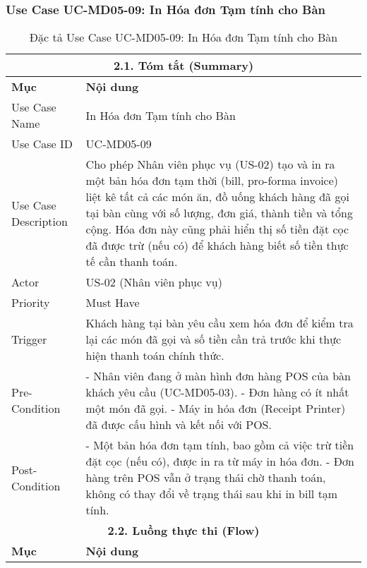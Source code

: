 \subsubsection{Use Case UC-MD05-09: In Hóa đơn Tạm tính cho Bàn}
\begin{longtable}{|m{4cm}|p{11cm}|}
\caption{Đặc tả Use Case UC-MD05-09: In Hóa đơn Tạm tính cho Bàn} \label{tab:uc_md05_09_final} \\
\hline
\multicolumn{2}{|c|}{\textbf{2.1. Tóm tắt (Summary)}} \\
\hline
\textbf{Mục} & \textbf{Nội dung} \\
\hline
\endhead %
\hline
\endfoot %
\hline
\endlastfoot %
Use Case Name & In Hóa đơn Tạm tính cho Bàn \\
\hline
Use Case ID & UC-MD05-09 \\
\hline
Use Case Description & Cho phép Nhân viên phục vụ (US-02) tạo và in ra một bản hóa đơn tạm thời (bill, pro-forma invoice) liệt kê tất cả các món ăn, đồ uống khách hàng đã gọi tại bàn cùng với số lượng, đơn giá, thành tiền và tổng cộng. Hóa đơn này cũng phải hiển thị số tiền đặt cọc đã được trừ (nếu có) để khách hàng biết số tiền thực tế cần thanh toán. \\
\hline
Actor & US-02 (Nhân viên phục vụ) \\
\hline
Priority & Must Have \\
\hline
Trigger & Khách hàng tại bàn yêu cầu xem hóa đơn để kiểm tra lại các món đã gọi và số tiền cần trả trước khi thực hiện thanh toán chính thức. \\
\hline
Pre-Condition & - Nhân viên đang ở màn hình đơn hàng POS của bàn khách yêu cầu (UC-MD05-03). \newline - Đơn hàng có ít nhất một món đã gọi. \newline - Máy in hóa đơn (Receipt Printer) đã được cấu hình và kết nối với POS. \\
\hline
Post-Condition & - Một bản hóa đơn tạm tính, bao gồm cả việc trừ tiền đặt cọc (nếu có), được in ra từ máy in hóa đơn. \newline - Đơn hàng trên POS vẫn ở trạng thái chờ thanh toán, không có thay đổi về trạng thái sau khi in bill tạm tính. \\
\hline
\multicolumn{2}{|c|}{\textbf{2.2. Luồng thực thi (Flow)}} \\
\hline
\textbf{Mục} & \textbf{Nội dung} \\
\hline

\end{longtable}
